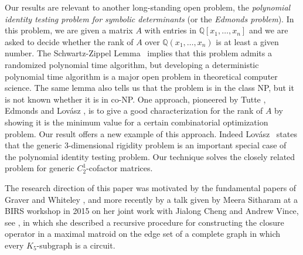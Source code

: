 \documentclass{daj}
\begin{document}
Our results are relevant to another long-standing open problem, the {\em polynomial identity testing problem for symbolic determinants} (or the {\em Edmonds problem}). In this problem, we are given a matrix $A$ with entries in $\mathbb{Q}[x_1,\dots, x_n]$ 
and we are asked to decide whether the rank of $A$ over $\mathbb{Q}(x_1,\dots, x_n)$ is at least a given number.
The Schwartz-Zippel Lemma~\cite{S80,Z79} implies that this problem admits a randomized polynomial time algorithm,
but developing a deterministic polynomial time algorithm is a major open problem in theoretical computer science.
The same  lemma  also tells us that the problem is in the class {\rm NP},
but it is not known whether it is in {\rm co-NP}.
One approach, pioneered by Tutte \cite{Tu}, Edmonds \cite{Ed} and Lov{\'a}sz \cite{L89}, is to give a good characterization for the rank of $A$
by showing it is the minimum value for a certain combinatorial optimization problem.
Our result offers a new example of this approach.
Indeed  Lov{\'a}sz~\cite[Section 5]{L89}   states that the generic 3-dimensional rigidity problem %
is an important special
case of  the polynomial identity testing problem. Our technique solves the closely related problem for generic $C_2^1$-cofactor matrices.

The research direction of this paper was motivated by the fundamental papers of Graver \cite{G91} and Whiteley \cite{Wsurvey}, and more recently by a talk given by Meera Sitharam at  a BIRS workshop
 in 2015 on her joint work with Jialong Cheng and Andrew Vince, see \cite{S15}, in which
she described a recursive procedure for constructing the  closure operator in a maximal matroid on the edge set of a 
 complete graph  in which every $K_5$-subgraph is a  circuit. 
\end{document}
